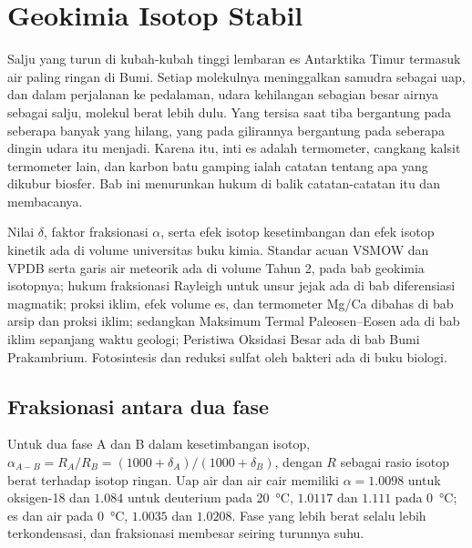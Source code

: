 \chapter{Geokimia Isotop Stabil}\label{ch:b3:stable-isotopes}

Salju yang turun di kubah-kubah tinggi lembaran es Antarktika Timur termasuk air
paling ringan di Bumi. Setiap molekulnya meninggalkan samudra sebagai uap, dan
dalam perjalanan ke pedalaman, udara kehilangan sebagian besar airnya sebagai salju, molekul berat
lebih dulu. Yang tersisa saat tiba bergantung pada seberapa banyak yang hilang, yang pada gilirannya bergantung pada
seberapa dingin udara itu menjadi. Karena itu, inti es adalah termometer, cangkang
kalsit termometer lain, dan karbon batu gamping ialah catatan tentang apa yang
dikubur biosfer. Bab ini menurunkan hukum di balik catatan-catatan itu dan
membacanya.

\begin{recall}
Nilai $\delta$, faktor fraksionasi $\alpha$, serta efek isotop kesetimbangan dan
efek isotop kinetik ada di volume universitas buku kimia. Standar
acuan VSMOW dan VPDB serta garis air meteorik ada di
volume Tahun 2, pada bab geokimia isotopnya; hukum fraksionasi
Rayleigh untuk unsur jejak ada di bab
diferensiasi magmatik; proksi iklim, efek volume es, dan termometer Mg/Ca
dibahas di bab arsip dan proksi iklim; sedangkan Maksimum Termal Paleosen--Eosen
ada di bab iklim sepanjang
waktu geologi; Peristiwa Oksidasi Besar ada di bab Bumi Prakambrium.
Fotosintesis dan reduksi sulfat oleh bakteri ada di buku biologi.
\end{recall}

\section{Fraksionasi antara dua fase}\label{sec:b3:stable-isotopes:fractionation}

Untuk dua fase A dan B dalam kesetimbangan isotop, $\alpha_{A-B} = R_A/R_B =
(1000 + \delta_A)/(1000 + \delta_B)$, dengan $R$ sebagai rasio isotop berat terhadap
isotop ringan. Uap air dan air cair memiliki $\alpha = 1.0098$ untuk oksigen-18
dan $1.084$ untuk deuterium pada \qty{20}{\celsius}, $1.0117$ dan $1.111$ pada
\qty{0}{\celsius}; es dan air pada \qty{0}{\celsius}, $1.0035$ dan $1.0208$.
Fase yang lebih berat selalu lebih terkondensasi, dan fraksionasi
membesar seiring turunnya suhu.

